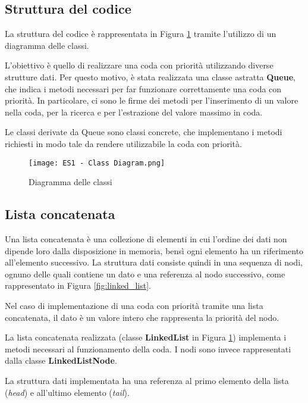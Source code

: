 \documentclass{article}
\begin{document}
\subsection{Struttura del codice}

La struttura del codice è rappresentata in Figura \ref{fig:class_diagram} tramite l'utilizzo di un diagramma delle classi.

L'obiettivo è quello di realizzare una coda con priorità utilizzando diverse strutture dati. Per questo motivo, è stata realizzata una classe astratta \textbf{Queue}, che indica i metodi necessari per far funzionare correttamente una coda con priorità. In particolare, ci sono le firme dei metodi per l'inserimento di un valore nella coda, per la ricerca e per l'estrazione del valore massimo in coda.

Le classi derivate da Queue sono classi concrete, che implementano i metodi richiesti in modo tale da rendere utilizzabile la coda con priorità.

\begin{figure}[h]
    \texttt{[image: ES1 - Class Diagram.png]}
    \centering
    \caption{Diagramma delle classi}
    \label{fig:class_diagram}
\end{figure}

\subsection{Lista concatenata}

Una lista concatenata è una collezione di elementi in cui l'ordine dei dati non dipende loro dalla disposizione in memoria, bensì ogni elemento ha un riferimento all'elemento successivo.
La struttura dati consiste quindi in una sequenza di nodi, ognuno delle quali contiene un dato e una referenza al nodo successivo, come rappresentato in Figura \ref{fig:linked_list}.

\vspace{5pt}
Nel caso di implementazione di una coda con priorità tramite una lista concatenata, il dato è un valore intero che rappresenta la priorità del nodo.

\vspace{5pt}
La lista concatenata realizzata (classe \textbf{LinkedList} in Figura \ref{fig:class_diagram}) implementa i metodi necessari al funzionamento della coda. I nodi sono invece rappresentati dalla classe \textbf{LinkedListNode}.

\vspace{5pt}
La struttura dati implementata ha una referenza al primo elemento della lista (\emph{head}) e all'ultimo elemento (\emph{tail}).
\end{document}
